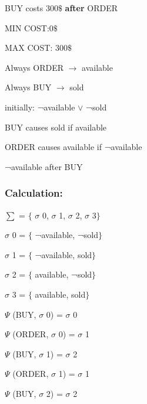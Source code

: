 \documentclass[11pt]{article}
\begin{document}
	BUY costs 300$\$$  \textbf{after} ORDER\par
	
	
	MIN COST:0$\$$ \par
	
	MAX COST: 300$\$$ \par
	
	
	Always ORDER $\rightarrow$ available\par
	
	Always BUY $\rightarrow$ sold\par
	
	initially: ¬available $\vee$  ¬sold\par
	
	BUY causes sold if available\par
	
	ORDER causes available if ¬available\par
	
	¬available after BUY\\
	
	\subsubsection{Calculation:}\label{par:p302}
	\indent \par
	$ \sum $ = $ \{ $ $ \sigma $ 0, $ \sigma $ 1, $ \sigma $ 2, $ \sigma $ 3$ \} $ \par
	
	$ \sigma $ 0 = $ \{ $ ¬available, ¬sold$ \} $ \par
	
	$ \sigma $ 1 = $ \{ $ ¬available, sold$ \} $ \par
	
	$ \sigma $ 2 = $ \{ $ available, ¬sold$ \} $ \par
	
	$ \sigma $ 3 = $ \{ $ available, sold$ \} $ \par
	\(  \Psi  \)  (BUY, $ \sigma $ 0) = $ \sigma $ 0\par
	
	\(  \Psi  \)  (ORDER, $ \sigma $ 0) = $ \sigma $ 1\par
	
	\(  \Psi  \)  (BUY, $ \sigma $ 1) = $ \sigma $ 2\par
	
	\(  \Psi  \)  (ORDER, $ \sigma $ 1) = $ \sigma $ 1\par
	
	\(  \Psi  \)  (BUY, $ \sigma $ 2) = $ \sigma $ 2\par
	
\end{document}
